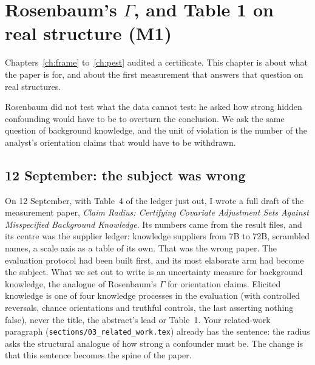 \chapter{Rosenbaum's \texorpdfstring{$\Gamma$}{Gamma}, and Table 1 on real structure (M1)}\label{ch:gamma}

Chapters~\ref{ch:frame} to~\ref{ch:pest} audited a certificate. This chapter is about what the
paper is for, and about the first measurement that answers that question on real structures.

\begin{ideia}
Rosenbaum did not test what the data cannot test: he asked how strong hidden confounding would
have to be to overturn the conclusion. We ask the same question of background knowledge, and the
unit of violation is the number of the analyst's orientation claims that would have to be withdrawn.
\end{ideia}

\begin{antes}
\end{antes}

\section{12 September: the subject was wrong}

On 12 September, with Table~4 of the ledger just out, I wrote a full draft of the measurement paper,
\emph{Claim Radius: Certifying Covariate Adjustment Sets Against Misspecified Background Knowledge}.
Its numbers came from the result files, and its centre was the supplier ledger: knowledge suppliers
from 7B to 72B, scrambled names, a scale axis as a table of its own. That was the wrong paper. The
evaluation protocol had been built first, and its most elaborate arm had become the subject. What we
set out to write is an uncertainty measure for background knowledge, the analogue of Rosenbaum's
$\Gamma$ for orientation claims. Elicited knowledge is one of four knowledge processes in the
evaluation (with controlled reversals, chance orientations and truthful controls, the last asserting nothing false), never the title,
the abstract's lead or Table~1. Your related-work paragraph (\texttt{sections/03\_related\_work.tex})
already has the sentence: the radius asks the structural analogue of how strong a confounder must be.
The change is that this sentence becomes the spine of the paper.

